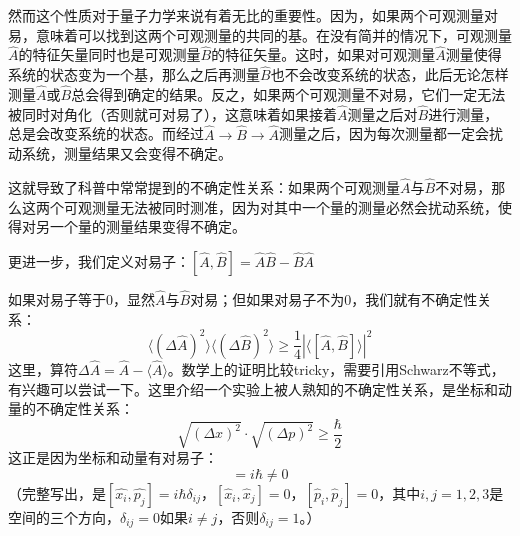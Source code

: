 \documentclass{ctexart}
\begin{document}
然而这个性质对于量子力学来说有着无比的重要性。因为，如果两个可观测量对易，意味着可以找到这两个可观测量的共同的基。在没有简并的情况下，可观测量$\hat{A}$的特征矢量同时也是可观测量$\hat{B}$的特征矢量。这时，如果对可观测量$\hat{A}$测量使得系统的状态变为一个基，那么之后再测量$\hat{B}$也不会改变系统的状态，此后无论怎样测量$\hat{A}$或$\hat{B}$总会得到确定的结果。反之，如果两个可观测量不对易，它们一定无法被同时对角化（否则就可对易了），这意味着如果接着$\hat{A}$测量之后对$\hat{B}$进行测量，总是会改变系统的状态。而经过$\hat{A}\to\hat{B}\to\hat{A}$测量之后，因为每次测量都一定会扰动系统，测量结果又会变得不确定。

这就导致了科普中常常提到的不确定性关系：如果两个可观测量$\hat{A}$与$\hat{B}$不对易，那么这两个可观测量无法被同时测准，因为对其中一个量的测量必然会扰动系统，使得对另一个量的测量结果变得不确定。

更进一步，我们定义对易子：$[\hat{A},\hat{B}]=\hat{A}\hat{B}-\hat{B}\hat{A}$

如果对易子等于0，显然$\hat{A}$与$\hat{B}$对易；但如果对易子不为0，我们就有不确定性关系：
\begin{equation}
\langle(\Delta \hat{A})^2\rangle\langle(\Delta \hat{B})^2\rangle\geq\frac{1}{4}|\langle[\hat{A},\hat{B}]\rangle|^2
\end{equation}
这里，算符$\Delta\hat{A}=\hat{A}-\langle\hat{A}\rangle$。数学上的证明比较tricky，需要引用Schwarz不等式，有兴趣可以尝试一下。这里介绍一个实验上被人熟知的不确定性关系，是坐标和动量的不确定性关系：
\begin{equation}
\sqrt{(\Delta x)^2}\cdot\sqrt{(\Delta p)^2}\geq\frac{\hbar}{2}
\end{equation}
这正是因为坐标和动量有对易子：
\begin{equation}
[\hat{x},\hat{p}]=i\hbar\neq 0
\end{equation}
（完整写出，是$[\hat{x_i},\hat{p_j}]=i\hbar\delta_{ij}$，$[\hat{x}_i,\hat{x}_j]=0$，$[\hat{p}_i,\hat{p}_j]=0$，其中$i,j=1,2,3$是空间的三个方向，$\delta_{ij}=0$如果$i\neq j$，否则$\delta_{ij}=1$。）
\end{document}
